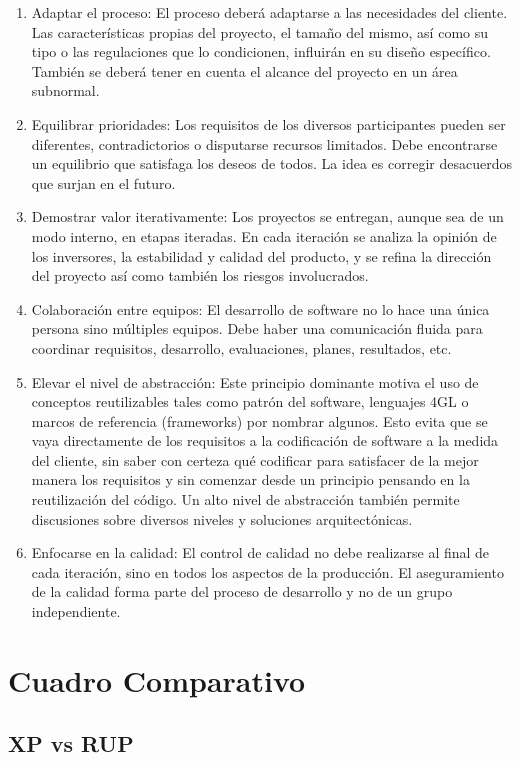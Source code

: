 \documentclass[a4paper,11pt]{article}
\begin{document}
\begin{enumerate}
\item Adaptar el proceso: El proceso deberá adaptarse a las necesidades del cliente. Las características propias del proyecto, el tamaño del mismo, así como su tipo o las regulaciones que lo condicionen, influirán en su diseño específico. También se deberá tener en cuenta el alcance del proyecto en un área subnormal.
\item  Equilibrar prioridades: Los requisitos de los diversos participantes pueden ser diferentes, contradictorios o disputarse recursos limitados. Debe encontrarse un equilibrio que satisfaga los deseos de todos. La idea es corregir desacuerdos que surjan en el futuro.
\item Demostrar valor iterativamente: Los proyectos se entregan, aunque sea de un modo interno, en etapas iteradas. En cada iteración se analiza la opinión de los inversores, la estabilidad y calidad del producto, y se refina la dirección del proyecto así como también los riesgos involucrados.
\item Colaboración entre equipos: El desarrollo de software no lo hace una única persona sino múltiples equipos. Debe haber una comunicación fluida para coordinar requisitos, desarrollo, evaluaciones, planes, resultados, etc.
\item Elevar el nivel de abstracción: Este principio dominante motiva el uso de conceptos reutilizables tales como patrón del software, lenguajes 4GL o marcos de referencia (frameworks) por nombrar algunos. Esto evita que se vaya directamente de los requisitos a la codificación de software a la medida del cliente, sin saber con certeza qué codificar para satisfacer de la mejor manera los requisitos y sin comenzar desde un principio pensando en la reutilización del código. Un alto nivel de abstracción también permite discusiones sobre diversos niveles y soluciones arquitectónicas.
\item Enfocarse en la calidad: El control de calidad no debe realizarse al final de cada iteración, sino en todos los aspectos de la producción. El aseguramiento de la calidad forma parte del proceso de desarrollo y no de un grupo independiente.
\end{enumerate}

\newpage

\section{Cuadro Comparativo }
\subsection{XP vs RUP}
\vspace{1cm}
\end{document}
